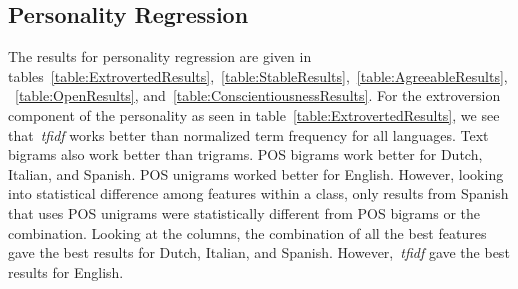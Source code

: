 \documentclass[a4paper]{llncs}
\begin{document}
\subsection{Personality Regression}
The results for personality regression are given in tables~\ref{table:ExtrovertedResults},~\ref{table:StableResults},~\ref{table:AgreeableResults},~\ref{table:OpenResults}, and~\ref{table:ConscientiousnessResults}. For the extroversion component of the personality as seen in table~\ref{table:ExtrovertedResults}, we see that~\textit{tfidf} works better than normalized term frequency for all languages. Text bigrams also work better than trigrams. POS bigrams work better for Dutch, Italian, and Spanish. POS unigrams worked better for English. However, looking into statistical difference among features within a class, only results from Spanish that uses POS unigrams were statistically different from POS bigrams or the combination. Looking at the columns, the combination of all the best features gave the best results for Dutch, Italian, and Spanish. However,~\textit{tfidf} gave the best results for English. 
\end{document}
